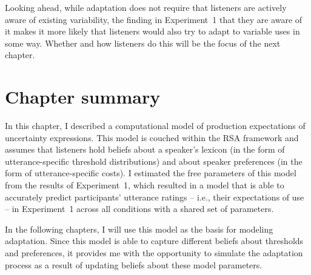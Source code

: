 Looking ahead, while adaptation does not require that listeners are actively aware of existing variability, the finding in Experiment~1 that they are
aware of it makes it more likely that listeners would also try to adapt to variable uses in some way. Whether and how listeners do this 
will be the focus of the next chapter.

\section{Chapter summary}

In this chapter, I described a computational model of production expectations of uncertainty expressions. This model
is couched within the RSA framework and assumes that listeners hold beliefs about a speaker's lexicon (in the form
of utterance-specific threshold distributions) and about speaker preferences (in the form of utterance-specific costs). I estimated 
the free parameters of this model from the results of Experiment~1, which resulted in a model that is able to accurately predict
participants' utterance ratings -- i.e., their expectations of use --  in Experiment~1 across all conditions with a shared set of parameters.

In the following chapters, I will use this model as the basis for modeling adaptation. Since this model
is able to capture different beliefs about thresholds and preferences, it provides me with the opportunity to simulate 
the adaptation process as a result of updating beliefs about these model parameters.

